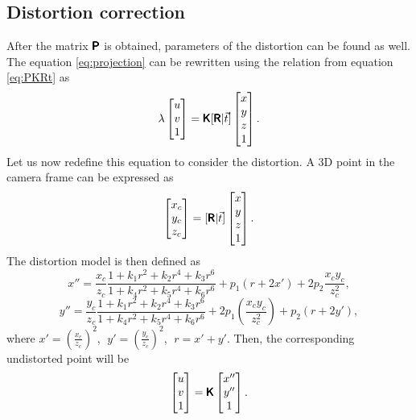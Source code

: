 \subsection{Distortion correction}
After the matrix $\pmb{\mathsf{P}}$ is obtained, parameters of the distortion can be found as well.
The equation \eqref{eq:projection} can be rewritten using the relation from equation \eqref{eq:PKRt} as
\begin{equation}
    \label{eq:dist_start}
    \lambda \begin{bmatrix} 
        u \\ v \\ 1 \end{bmatrix} = \pmb{\mathsf{K}} [\pmb{\mathsf{R}} | \vec{t}] \begin{bmatrix} x \\ y \\ z \\ 1
    \end{bmatrix}.
\end{equation}
Let us now redefine this equation to consider the distortion. A 3D point in the camera frame can be expressed as 
\begin{equation}
    \label{eq:dist_2}
    \begin{bmatrix} x_c \\ y_c \\ z_c \end{bmatrix}
     = [\pmb{\mathsf{R}} | \vec{t}] \begin{bmatrix} x \\ y \\ z \\ 1
    \end{bmatrix}.
\end{equation}
The distortion model is then defined as 
\begin{equation}
    \label{eq:dist_3}
    x'' = \frac{x_c}{z_c} \frac{1 + k_1r^2 + k_2r^4 + k_3r^6}{1 + k_4r^2 + k_5r^4 + k_6r^6} + p_1(r + 2x') + 2p_2\frac{x_c y_c}{z^2_c},
\end{equation}
\begin{equation}
    \label{eq:dist_4}
    y'' = \frac{y_c}{z_c} \frac{1 + k_1r^2 + k_2r^4 + k_3r^6}{1 + k_4r^2 + k_5r^4 + k_6r^6} + 2p_1(\frac{x_c y_c}{z_c^2}) + p_2(r + 2y'),
\end{equation}
where $x' = (\frac{x_c}{z_c})^2$, $\;y' = (\frac{y_c}{z_c})^2$, $\;r = x' + y'$. Then, the corresponding undistorted point will be
\begin{equation}
    \label{eq:dist_end}
    \begin{bmatrix} u \\ v \\ 1 \end{bmatrix} = \pmb{\mathsf{K}} \begin{bmatrix} x'' \\ y'' \\ 1 \end{bmatrix}.
\end{equation}

